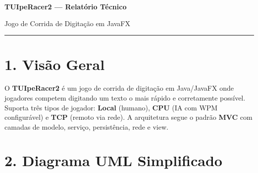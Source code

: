 \documentclass[11pt,a4paper]{article}
\begin{document}
{\centering\Large\bfseries TUIpeRacer2 — Relatório Técnico\par}
{\centering\small Jogo de Corrida de Digitação em JavaFX\par}
\vspace{4pt}\hrule\vspace{8pt}

\section*{1. Visão Geral}

O \textbf{TUIpeRacer2} é um jogo de corrida de digitação em Java/JavaFX onde jogadores competem digitando um texto o mais rápido e corretamente possível. Suporta três tipos de jogador: \textbf{Local} (humano), \textbf{CPU} (IA com WPM configurável) e \textbf{TCP} (remoto via rede). A arquitetura segue o padrão \textbf{MVC} com camadas de modelo, serviço, persistência, rede e view.

\section*{2. Diagrama UML Simplificado}
\end{document}
